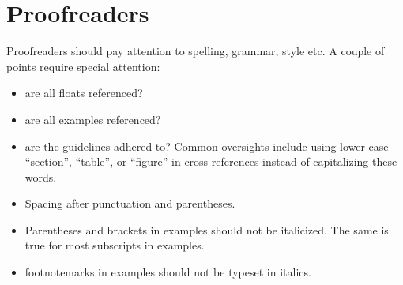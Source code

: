 \chapter{Proofreaders}
Proofreaders should pay attention to spelling, grammar, style etc. A couple of points require special attention:
\begin{itemize}
 \item are all floats referenced?
 \item are all examples referenced?
 \item are the guidelines adhered to? Common oversights include using lower case ``section'', ``table'', or ``figure'' in cross-references instead of capitalizing these words. 
 \item Spacing after punctuation and parentheses.
 \item Parentheses and brackets in examples should not be italicized. The same is true for most subscripts in examples.
 \item footnotemarks in examples should not be typeset in italics.
\end{itemize}








